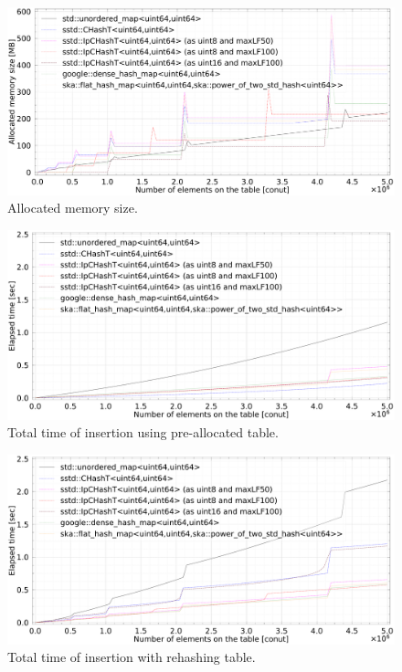 \begin{figure}[h]
  \hspace{-1mm}
  \includegraphics[scale=0.24]{./fig_bench/usedMemory.pdf}
  \caption{ Allocated memory size. }
  \label{fig_bench_memory}
\end{figure}

\begin{figure}[h]
  \includegraphics[scale=0.24]{./fig_bench/insert_et_preAlloc_med.pdf}
  \caption{ Total time of insertion using pre-allocated table. }
  \label{fig_bench_insert_preAlloc}
\end{figure}

\begin{figure}[h]
  \includegraphics[scale=0.24]{./fig_bench/insert_et_med.pdf}
  \caption{ Total time of insertion with rehashing table. }
  \label{fig_bench_insert_wRehash}
\end{figure}

